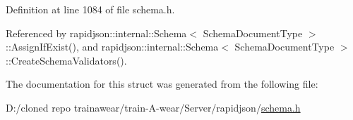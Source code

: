 Definition at line 1084 of file schema.\+h.



Referenced by rapidjson\+::internal\+::\+Schema$<$ Schema\+Document\+Type $>$\+::\+Assign\+If\+Exist(), and rapidjson\+::internal\+::\+Schema$<$ Schema\+Document\+Type $>$\+::\+Create\+Schema\+Validators().



The documentation for this struct was generated from the following file\+:\begin{DoxyCompactItemize}
\item 
D\+:/cloned repo trainawear/train-\/\+A-\/wear/\+Server/rapidjson/\mbox{\hyperlink{schema_8h}{schema.\+h}}\end{DoxyCompactItemize}
